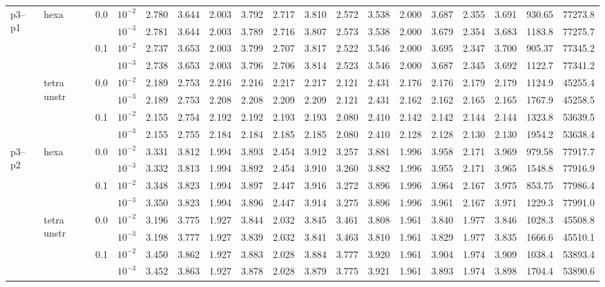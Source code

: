 \begin{longtable}{llclrrrrrrrrrrrrrr}
\multirow{8}{*}{p3--p1} & \multirow{4}{*}{hexa} & \multirow{2}{*}{0.0} & $10^{-2}$ & 2.780 & 3.644 & 2.003 & 3.792 & 2.717 & 3.810 & 2.572 & 3.538 & 2.000 & 3.687 & 2.355 & 3.691 & 930.65 & 77273.8 \\
& & & $10^{-3}$ & 2.781 & 3.644 & 2.003 & 3.789 & 2.716 & 3.807 & 2.573 & 3.538 & 2.000 & 3.679 & 2.354 & 3.683 & 1183.8 & 77275.7 \\\cline{3-18}
& & \multirow{2}{*}{0.1} & $10^{-2}$ & 2.737 & 3.653 & 2.003 & 3.799 & 2.707 & 3.817 & 2.522 & 3.546 & 2.000 & 3.695 & 2.347 & 3.700 & 905.37 & 77345.2 \\
& & & $10^{-3}$ & 2.738 & 3.653 & 2.003 & 3.796 & 2.706 & 3.814 & 2.523 & 3.546 & 2.000 & 3.687 & 2.345 & 3.692 & 1122.7 & 77341.2 \\\cline{2-18}
& \multirow{4}{*}{tetra unstr} & \multirow{2}{*}{0.0} & $10^{-2}$ & 2.189 & 2.753 & 2.216 & 2.216 & 2.217 & 2.217 & 2.121 & 2.431 & 2.176 & 2.176 & 2.179 & 2.179 & 1124.9 & 45255.4 \\
& & & $10^{-3}$ & 2.189 & 2.753 & 2.208 & 2.208 & 2.209 & 2.209 & 2.121 & 2.431 & 2.162 & 2.162 & 2.165 & 2.165 & 1767.9 & 45258.5 \\\cline{3-18}
& & \multirow{2}{*}{0.1} & $10^{-2}$ & 2.155 & 2.754 & 2.192 & 2.192 & 2.193 & 2.193 & 2.080 & 2.410 & 2.142 & 2.142 & 2.144 & 2.144 & 1323.8 & 53639.5 \\
& & & $10^{-3}$ & 2.155 & 2.755 & 2.184 & 2.184 & 2.185 & 2.185 & 2.080 & 2.410 & 2.128 & 2.128 & 2.130 & 2.130 & 1954.2 & 53638.4 \\\hline

\multirow{8}{*}{p3--p2} & \multirow{4}{*}{hexa} & \multirow{2}{*}{0.0} & $10^{-2}$ & 3.331 & 3.812 & 1.994 & 3.893 & 2.454 & 3.912 & 3.257 & 3.881 & 1.996 & 3.958 & 2.171 & 3.969 & 979.58 & 77917.7 \\
& & & $10^{-3}$ & 3.332 & 3.813 & 1.994 & 3.892 & 2.454 & 3.910 & 3.260 & 3.882 & 1.996 & 3.955 & 2.171 & 3.965 & 1548.8 & 77916.9 \\\cline{3-18}
& & \multirow{2}{*}{0.1} & $10^{-2}$ & 3.348 & 3.823 & 1.994 & 3.897 & 2.447 & 3.916 & 3.272 & 3.896 & 1.996 & 3.964 & 2.167 & 3.975 & 853.75 & 77986.4 \\
& & & $10^{-3}$ & 3.350 & 3.823 & 1.994 & 3.896 & 2.447 & 3.914 & 3.275 & 3.896 & 1.996 & 3.961 & 2.167 & 3.971 & 1229.3 & 77991.0 \\\cline{2-18}
& \multirow{4}{*}{tetra unstr} & \multirow{2}{*}{0.0} & $10^{-2}$ & 3.196 & 3.775 & 1.927 & 3.844 & 2.032 & 3.845 & 3.461 & 3.808 & 1.961 & 3.840 & 1.977 & 3.846 & 1028.3 & 45508.8 \\
& & & $10^{-3}$ & 3.198 & 3.777 & 1.927 & 3.839 & 2.032 & 3.841 & 3.463 & 3.810 & 1.961 & 3.829 & 1.977 & 3.835 & 1666.6 & 45510.1 \\\cline{3-18}
& & \multirow{2}{*}{0.1} & $10^{-2}$ & 3.450 & 3.862 & 1.927 & 3.883 & 2.028 & 3.884 & 3.777 & 3.920 & 1.961 & 3.904 & 1.974 & 3.909 & 1038.4 & 53893.4 \\
& & & $10^{-3}$ & 3.452 & 3.863 & 1.927 & 3.878 & 2.028 & 3.879 & 3.775 & 3.921 & 1.961 & 3.893 & 1.974 & 3.898 & 1704.4 & 53890.6 \\\hline


\end{longtable}

